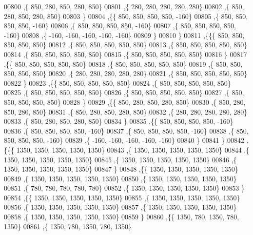 \begin{DoxyCode}
00800    ,\{   850,   280,   850,   280,   850\}
00801    ,\{   280,   280,   280,   280,   280\}
00802    ,\{   850,   280,   850,   280,   850\}
00803    \}
00804   ,\{\{   850,   850,   850,   850,  -160\}
00805    ,\{   850,   850,   850,   850,  -160\}
00806    ,\{   850,   850,   850,   850,  -160\}
00807    ,\{   850,   850,   850,   850,  -160\}
00808    ,\{  -160,  -160,  -160,  -160,  -160\}
00809    \}
00810   \}
00811  ,\{\{\{   850,   850,   850,   850,   850\}
00812    ,\{   850,   850,   850,   850,   850\}
00813    ,\{   850,   850,   850,   850,   850\}
00814    ,\{   850,   850,   850,   850,   850\}
00815    ,\{   850,   850,   850,   850,   850\}
00816    \}
00817   ,\{\{   850,   850,   850,   850,   850\}
00818    ,\{   850,   850,   850,   850,   850\}
00819    ,\{   850,   850,   850,   850,   850\}
00820    ,\{   280,   280,   280,   280,   280\}
00821    ,\{   850,   850,   850,   850,   850\}
00822    \}
00823   ,\{\{   850,   850,   850,   850,   850\}
00824    ,\{   850,   850,   850,   850,   850\}
00825    ,\{   850,   850,   850,   850,   850\}
00826    ,\{   850,   850,   850,   850,   850\}
00827    ,\{   850,   850,   850,   850,   850\}
00828    \}
00829   ,\{\{   850,   280,   850,   280,   850\}
00830    ,\{   850,   280,   850,   280,   850\}
00831    ,\{   850,   280,   850,   280,   850\}
00832    ,\{   280,   280,   280,   280,   280\}
00833    ,\{   850,   280,   850,   280,   850\}
00834    \}
00835   ,\{\{   850,   850,   850,   850,  -160\}
00836    ,\{   850,   850,   850,   850,  -160\}
00837    ,\{   850,   850,   850,   850,  -160\}
00838    ,\{   850,   850,   850,   850,  -160\}
00839    ,\{  -160,  -160,  -160,  -160,  -160\}
00840    \}
00841   \}
00842  ,\{\{\{  1350,  1350,  1350,  1350,  1350\}
00843    ,\{  1350,  1350,  1350,  1350,  1350\}
00844    ,\{  1350,  1350,  1350,  1350,  1350\}
00845    ,\{  1350,  1350,  1350,  1350,  1350\}
00846    ,\{  1350,  1350,  1350,  1350,  1350\}
00847    \}
00848   ,\{\{  1350,  1350,  1350,  1350,  1350\}
00849    ,\{  1350,  1350,  1350,  1350,  1350\}
00850    ,\{  1350,  1350,  1350,  1350,  1350\}
00851    ,\{   780,   780,   780,   780,   780\}
00852    ,\{  1350,  1350,  1350,  1350,  1350\}
00853    \}
00854   ,\{\{  1350,  1350,  1350,  1350,  1350\}
00855    ,\{  1350,  1350,  1350,  1350,  1350\}
00856    ,\{  1350,  1350,  1350,  1350,  1350\}
00857    ,\{  1350,  1350,  1350,  1350,  1350\}
00858    ,\{  1350,  1350,  1350,  1350,  1350\}
00859    \}
00860   ,\{\{  1350,   780,  1350,   780,  1350\}
00861    ,\{  1350,   780,  1350,   780,  1350\}

\end{DoxyCode}
